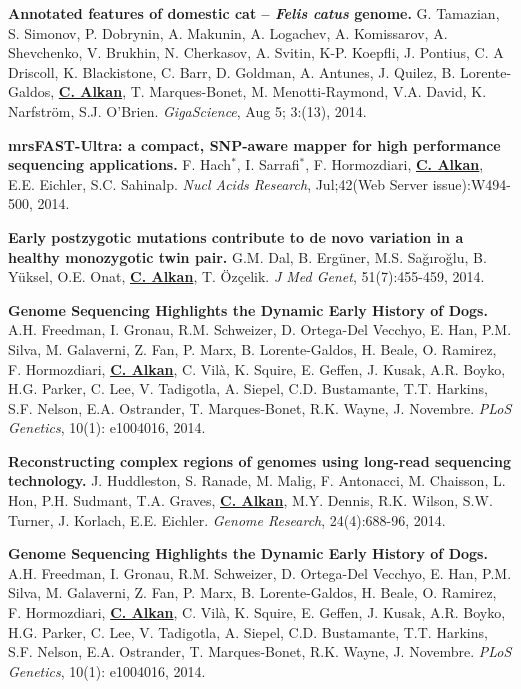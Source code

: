   \vspace{-.2cm}        
  {\bf Annotated features of domestic cat – \textit{Felis catus} genome.}
  G. Tamazian, S. Simonov, P. Dobrynin, A. Makunin, A. Logachev, 
  A. Komissarov, A. Shevchenko, V. Brukhin, N. Cherkasov, A. Svitin,
  K-P. Koepfli, J. Pontius, C. A Driscoll, K. Blackistone, C. Barr, 
  D. Goldman, A. Antunes, J. Quilez, B. Lorente-Galdos,  {\bf {\underline {C. Alkan}}},
  T. Marques-Bonet, M. Menotti-Raymond, V.A. David, K. Narfström, S.J. O’Brien.
  {\em GigaScience}, Aug 5; 3:(13), 2014.
                                       
  \vspace{-.2cm}        
  {\bf mrsFAST-Ultra: a compact, SNP-aware mapper for high performance sequencing applications.}
    F. Hach$^*$,
    I. Sarrafi$^*$,
    F. Hormozdiari,
    {\bf {\underline {C. Alkan}}},
    E.E. Eichler,   S.C. Sahinalp.
    {\em Nucl Acids Research}, Jul;42(Web Server issue):W494-500, 2014.

  \vspace{-.2cm}        
         {\bf Early postzygotic mutations contribute to de novo variation in a healthy monozygotic twin pair.}
         G.M. Dal, B. Ergüner, M.S. Sağıroğlu, B. Yüksel, O.E. Onat, {\bf {\underline {C. Alkan}}}, T. Özçelik. 
         {\em J Med Genet}, 51(7):455-459, 2014.


  \vspace{-.2cm}        
         {\bf Genome Sequencing Highlights the Dynamic Early History of Dogs.} 
         A.H. Freedman, I. Gronau, R.M. Schweizer, D. Ortega-Del Vecchyo, E. Han, P.M. Silva, 
         M. Galaverni, Z. Fan, P. Marx, B. Lorente-Galdos, H. Beale, O. Ramirez, F. Hormozdiari, 
         {\bf {\underline {C. Alkan}}}, 
         C. Vilà, K. Squire, E. Geffen, J. Kusak, A.R. Boyko, H.G. Parker, 
         C. Lee, V. Tadigotla, A. Siepel, C.D. Bustamante, T.T. Harkins, S.F. Nelson, 
         E.A. Ostrander, T. Marques-Bonet, R.K. Wayne, J. Novembre. 
         {\em PLoS Genetics}, 10(1): e1004016, 2014.


 \vspace{-.2cm}        
        {\bf Reconstructing complex regions of genomes using long-read sequencing technology.}
         J. Huddleston, S. Ranade, M. Malig, F. Antonacci, M. Chaisson, L. Hon, P.H. Sudmant, T.A. Graves, 
         {\bf {\underline{C. Alkan}}}, M.Y. Dennis, R.K. Wilson, S.W. Turner, J. Korlach, E.E. Eichler. 
         {\em Genome Research},  24(4):688-96, 2014.

 \vspace{-.2cm}        
        {\bf Genome Sequencing Highlights the Dynamic Early History of Dogs.}
        A.H. Freedman, I. Gronau, R.M. Schweizer, D. Ortega-Del Vecchyo, E. Han, P.M. Silva, M. Galaverni, Z. Fan, P. Marx, B. Lorente-Galdos, H. Beale, O. Ramirez, F. Hormozdiari, 
        {\bf {\underline{C. Alkan}}}, C. Vilà, K. Squire, E. Geffen, J. Kusak, A.R. Boyko, H.G. Parker, C. Lee, V. Tadigotla, A. Siepel, C.D. Bustamante, T.T. Harkins, 
        S.F. Nelson, E.A. Ostrander, T. Marques-Bonet, R.K. Wayne, J. Novembre. 
        {\em PLoS Genetics}, 10(1): e1004016, 2014.


